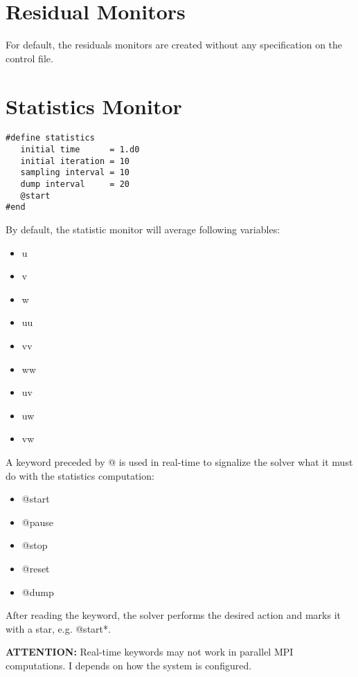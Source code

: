 \documentclass[a4paper,10pt]{report}
\begin{document}
\section{Residual Monitors}
For default, the residuals monitors are created without any specification on the control file.

\section{Statistics Monitor}
\begin{lstlisting}
#define statistics
   initial time      = 1.d0
   initial iteration = 10
   sampling interval = 10
   dump interval     = 20
   @start
#end
\end{lstlisting}

By default, the statistic monitor will average following variables:

\begin{multicols}{3}
\begin{itemize}
\item u
\item v
\item w
\item uu 
\item vv 
\item ww 
\item uv 
\item uw 
\item vw 
\end{itemize}
\end{multicols}

A keyword preceded by @ is used in real-time to signalize the solver what it must do with the statistics computation:

\begin{multicols}{3}
\begin{itemize}
\item @start
\item @pause
\item @stop
\item @reset
\item @dump
\end{itemize}
\end{multicols}

After reading the keyword, the solver performs the desired action and marks it with a star, e.g. @start*.

\textbf{ATTENTION:} Real-time keywords may not work in parallel MPI computations. I depends on how the system is configured.
\end{document}
